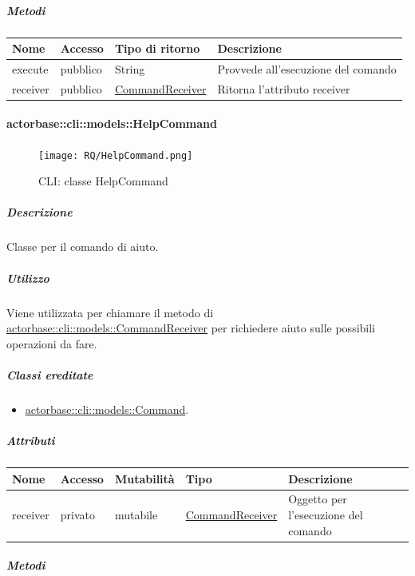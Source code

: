 \documentclass{scalatekids-article}
\begin{document}
\subparagraph{Metodi}

\begin{tabular}{| p{3cm} | p{1.5cm} | p{3.5cm} | p{9cm} |}
  \hline
  Nome & Accesso & Tipo di ritorno & Descrizione\\
  \hline
  execute & pubblico & String & Provvede all'esecuzione del comando\\
  \hline
  receiver & pubblico & \hyperref[sec:actorbase::cli::models::CommandReceiver]{CommandReceiver} & Ritorna l'attributo receiver\\
  \hline
\end{tabular}


\paragraph{actorbase::cli::models::HelpCommand}
\label{sec:actorbase::cli::models::HelpCommand}

\begin{figure}[H]
  \begin{center}
    \texttt{[image: RQ/HelpCommand.png]}
    \caption{CLI: classe HelpCommand}
  \end{center}
\end{figure}

\subparagraph{Descrizione}

Classe per il comando di aiuto.

\subparagraph{Utilizzo}
Viene utilizzata per chiamare il metodo di
\hyperref[sec:actorbase::cli::models::CommandReceiver]{actorbase::cli::models::CommandReceiver} per richiedere aiuto sulle possibili operazioni da fare.

\subparagraph{Classi ereditate}
\begin{itemize}
\item \hyperref[sec:actorbase::cli::models::Command]{actorbase::cli::models::Command}.
\end{itemize}

\subparagraph{Attributi}

\begin{tabular}{| p{1cm} | p{1.5cm} | p{2cm} | p{4cm} | p{8.5cm} |}
  \hline
  Nome & Accesso & Mutabilità & Tipo & Descrizione\\
  \hline
  receiver & privato & mutabile & \hyperref[sec:actorbase::cli::models::CommandReceiver]{CommandReceiver} & Oggetto per l'esecuzione del comando \\
  \hline
\end{tabular}

\subparagraph{Metodi}
\end{document}
